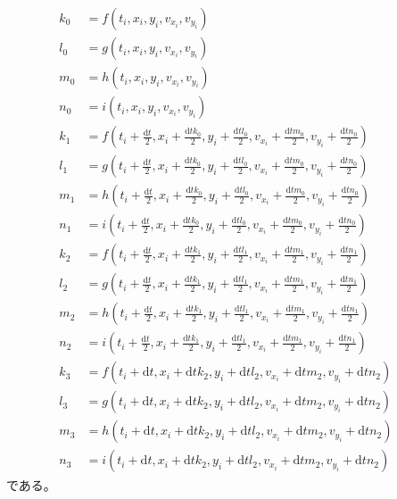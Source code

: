\documentclass[a4paper,twoside]{jarticle}
\begin{document}
\begin{align}
  k_0&=f\left(t_i,x_i,y_i,v_{x_{i}},v_{y_{i}}\right)&\\
  l_0&=g\left(t_i,x_i,y_i,v_{x_{i}},v_{y_{i}}\right)&\\
  m_0&=h\left(t_i,x_i,y_i,v_{x_{i}},v_{y_{i}}\right)&\\
  n_0&=i\left(t_i,x_i,y_i,v_{x_{i}},v_{y_{i}}\right)&\\
  k_1&=f\left(t_i+\frac{\mathrm{d}t}{2},x_i+\frac{\mathrm{d}tk_0}{2},y_i+\frac{\mathrm{d}tl_0}{2},v_{x_{i}}+\frac{\mathrm{d}tm_0}{2},v_{y_{i}}+\frac{\mathrm{d}tn_0}{2}\right)&\\
  l_1&=g\left(t_i+\frac{\mathrm{d}t}{2},x_i+\frac{\mathrm{d}tk_0}{2},y_i+\frac{\mathrm{d}tl_0}{2},v_{x_{i}}+\frac{\mathrm{d}tm_0}{2},v_{y_{i}}+\frac{\mathrm{d}tn_0}{2}\right)&\\
  m_1&=h\left(t_i+\frac{\mathrm{d}t}{2},x_i+\frac{\mathrm{d}tk_0}{2},y_i+\frac{\mathrm{d}tl_0}{2},v_{x_{i}}+\frac{\mathrm{d}tm_0}{2},v_{y_{i}}+\frac{\mathrm{d}tn_0}{2}\right)&\\
  n_1&=i\left(t_i+\frac{\mathrm{d}t}{2},x_i+\frac{\mathrm{d}tk_0}{2},y_i+\frac{\mathrm{d}tl_0}{2},v_{x_{i}}+\frac{\mathrm{d}tm_0}{2},v_{y_{i}}+\frac{\mathrm{d}tn_0}{2}\right)&\\
  k_2&=f\left(t_i+\frac{\mathrm{d}t}{2},x_i+\frac{\mathrm{d}tk_1}{2},y_i+\frac{\mathrm{d}tl_1}{2},v_{x_{i}}+\frac{\mathrm{d}tm_1}{2},v_{y_{i}}+\frac{\mathrm{d}tn_1}{2}\right)&\\
  l_2&=g\left(t_i+\frac{\mathrm{d}t}{2},x_i+\frac{\mathrm{d}tk_1}{2},y_i+\frac{\mathrm{d}tl_1}{2},v_{x_{i}}+\frac{\mathrm{d}tm_1}{2},v_{y_{i}}+\frac{\mathrm{d}tn_1}{2}\right)&\\
  m_2&=h\left(t_i+\frac{\mathrm{d}t}{2},x_i+\frac{\mathrm{d}tk_1}{2},y_i+\frac{\mathrm{d}tl_1}{2},v_{x_{i}}+\frac{\mathrm{d}tm_1}{2},v_{y_{i}}+\frac{\mathrm{d}tn_1}{2}\right)&\\
  n_2&=i\left(t_i+\frac{\mathrm{d}t}{2},x_i+\frac{\mathrm{d}tk_1}{2},y_i+\frac{\mathrm{d}tl_1}{2},v_{x_{i}}+\frac{\mathrm{d}tm_1}{2},v_{y_{i}}+\frac{\mathrm{d}tn_1}{2}\right)&\\
  k_3&=f\left(t_i+\mathrm{d}t,x_i+\mathrm{d}tk_2,y_i+\mathrm{d}tl_2,v_{x_{i}}+\mathrm{d}tm_2,v_{y_{i}}+\mathrm{d}tn_2\right)&\\
  l_3&=g\left(t_i+\mathrm{d}t,x_i+\mathrm{d}tk_2,y_i+\mathrm{d}tl_2,v_{x_{i}}+\mathrm{d}tm_2,v_{y_{i}}+\mathrm{d}tn_2\right)&\\
  m_3&=h\left(t_i+\mathrm{d}t,x_i+\mathrm{d}tk_2,y_i+\mathrm{d}tl_2,v_{x_{i}}+\mathrm{d}tm_2,v_{y_{i}}+\mathrm{d}tn_2\right)&\\
  n_3&=i\left(t_i+\mathrm{d}t,x_i+\mathrm{d}tk_2,y_i+\mathrm{d}tl_2,v_{x_{i}}+\mathrm{d}tm_2,v_{y_{i}}+\mathrm{d}tn_2\right)&
\end{align}
\normalsize
である。
\end{document}
